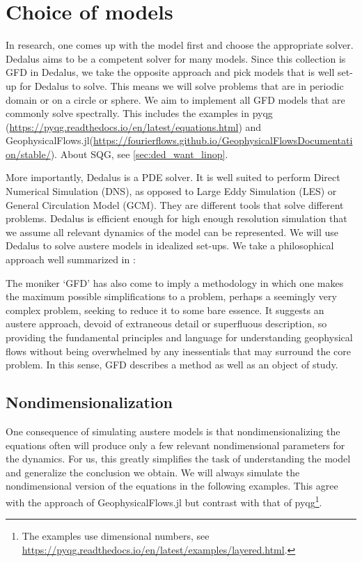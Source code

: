 \section{Choice of models}
In research, one comes up with the model first and choose the appropriate solver. Dedalus aims to be a competent solver for many models. Since this collection is GFD in Dedalus, we take the opposite approach and pick models that is well set-up for Dedalus to solve. This means we will solve problems that are in periodic domain or on a circle or sphere. We aim to implement all GFD models that are commonly solve spectrally. This includes the examples in pyqg (\url{https://pyqg.readthedocs.io/en/latest/equations.html}) and GeophysicalFlows.jl(\url{https://fourierflows.github.io/GeophysicalFlowsDocumentation/stable/}). About SQG, see \ref{sec:ded_want_linop}.

More importantly, Dedalus is a PDE solver. It is well suited to perform Direct Numerical Simulation (DNS), as opposed to Large Eddy Simulation (LES) or General Circulation Model (GCM). They are different tools that solve different problems. Dedalus is efficient enough for high enough resolution simulation that we assume all relevant dynamics of the model can be represented. We will use Dedalus to solve austere models in idealized set-ups. We take a philosophical approach well summarized in \cite{Vallis_16}:
\begin{displayquote}
    The moniker ‘GFD’ has also come to imply a methodology in which one makes the maximum possible simplifications to a problem, perhaps a seemingly very complex problem, seeking to reduce it to some bare essence. It suggests an austere approach, devoid of extraneous detail or superfluous description, so providing the fundamental principles and language for understanding geophysical flows without being overwhelmed by any inessentials that may surround the core problem. In this sense, GFD describes a method as well as an object of study.
\end{displayquote}

\subsection{Nondimensionalization}
\newcommand{\Ro}{\{\text{Ro}\}}
\newcommand{\Fr}{\{\text{Fr}\}}
\newcommand{\Ub}{\left\{\frac{\text{Fr}^2}{\text{Ro}^2}\right\}}
\newcommand{\Bu}{\left\{\frac{\text{Ro}^2}{\text{Fr}^2}\right\}}

One consequence of simulating austere models is that nondimensionalizing the equations often will produce only a few relevant nondimensional parameters for the dynamics. For us, this greatly simplifies the task of understanding the model and generalize the conclusion we obtain. We will always simulate the nondimensional version of the equations in the following examples. This agree with the approach of GeophysicalFlows.jl but contrast with that of pyqg\footnote{The examples use dimensional numbers, see \url{https://pyqg.readthedocs.io/en/latest/examples/layered.html}.}. 

